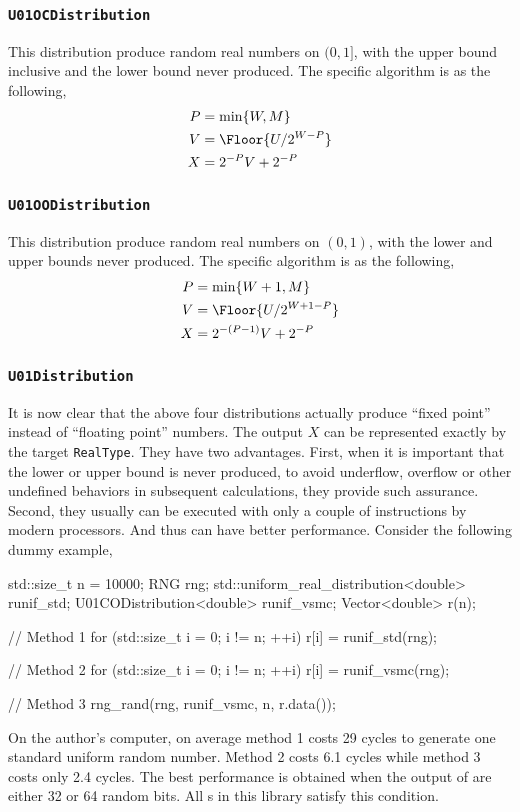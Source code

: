 \subsubsection{\texttt{U01OCDistribution}}

This distribution produce random real numbers on $(0, 1]$, with the upper bound
inclusive and the lower bound never produced. The specific algorithm is as the
following,
\begin{align*}
  P &= \min\{W, M\} \\
  V &= \Floor{U / 2^{W - P}} \\
  X &= 2^{-P} V + 2^{-P}
\end{align*}

\subsubsection{\texttt{U01OODistribution}}

This distribution produce random real numbers on $(0, 1)$, with the lower and
upper bounds never produced. The specific algorithm is as the following,
\begin{align*}
  P &= \min\{W + 1, M\} \\
  V &= \Floor{U / 2^{W + 1 - P}} \\
  X &= 2^{-(P - 1)} V + 2^{-P}
\end{align*}

\subsubsection{\texttt{U01Distribution}}

It is now clear that the above four distributions actually produce ``fixed
point'' instead of ``floating point'' numbers. The output $X$ can be
represented exactly by the target \verb|RealType|. They have two advantages.
First, when it is important that the lower or upper bound is never produced, to
avoid underflow, overflow or other undefined behaviors in subsequent
calculations, they provide such assurance. Second, they usually can be executed
with only a couple of instructions by modern processors. And thus can have
better performance. Consider the following dummy example,
\begin{cppcode}
  std::size_t n = 10000;
  RNG rng;
  std::uniform_real_distribution<double> runif_std;
  U01CODistribution<double> runif_vsmc;
  Vector<double> r(n);

  // Method 1
  for (std::size_t i = 0; i != n; ++i)
      r[i] = runif_std(rng);

  // Method 2
  for (std::size_t i = 0; i != n; ++i)
      r[i] = runif_vsmc(rng);

  // Method 3
  rng_rand(rng, runif_vsmc, n, r.data());
\end{cppcode}
On the author's computer, on average method 1 costs 29 cycles to generate one
standard uniform random number. Method 2 costs 6.1 cycles while method 3 costs
only 2.4 cycles. The best performance is obtained when the output of \rng are
either 32 or 64 random bits. All \rng{}s in this library satisfy this
condition.

